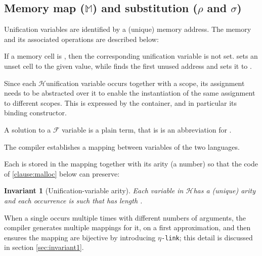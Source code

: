 \documentclass[sigconf,natbib=false,review]{acmart}
\newtheorem{invariant}{Invariant}
\newcommand{\linkMacro}[1]{\ensuremath{#1}\texttt{-link}\xspace}
\newcommand{\linketa} {\linkMacro{\eta}}
\newcommand{\Fo}{\texorpdfstring{\ensuremath{\mathcal{F}\xspace}}{F}} %
\newcommand{\Ho}{\texorpdfstring{\ensuremath{\mathcal{H}}\xspace}{H}}
\newcommand{\mapStore}{\texorpdfstring{\ensuremath{\mathbb{M}}\xspace}{M}}
\begin{document}
\subsection{Memory map (\mapStore) and substitution (\texorpdfstring{$\rho$ and $\sigma$}{rho and sigma})}
\label{sec:grounwork}


% 

Unification variables are identified by a (unique) memory address.
The memory and its associated operations are described below:



\noindent
If a memory cell is , then the corresponding unification variable
is not set.  sets an unset cell to the given value, while
 finds the first unused address and sets it to .

Since each \Ho unification variable occurs together with a scope,
its assignment needs to be abstracted over it to enable the
instantiation of the same assignment to different scopes.
This is expressed by the  container, and in particular
its  binding constructor.



\noindent
A solution to a \Fo{} variable is a plain term, that is 
is an abbreviation for .

The compiler establishes a mapping between variables of the two languages.



\noindent
Each  is stored in the mapping together with
its arity (a number) so that the code of \ref{clause:malloc} below can preserve:

\begin{invariant}[Unification-variable arity]\label{inv:uvaarity}
  Each variable 
  in \Ho has a (unique) arity  and each occurrence
   is such that  has length .
\end{invariant}



\noindent
When a single  occurs multiple times with different numbers
of arguments, the compiler generates multiple mappings for it, on a first
approximation, and then ensures the mapping are bijective by introducing
\linketa; this detail is discussed in section \ref{sec:invariant1}.
\end{document}
